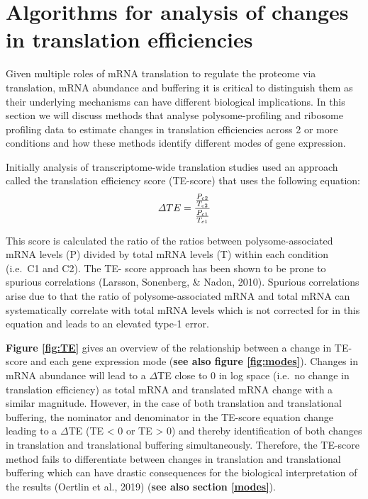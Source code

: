 \documentclass[12pt,openany]{book}
\begin{document}
\section{Algorithms for analysis of changes in translation efficiencies}\label{algorithm}

Given multiple roles of mRNA translation to regulate the proteome via
translation, mRNA abundance and buffering it is critical to distinguish
them as their underlying mechanisms can have different biological
implications. In this section we will discuss methods that analyse
polysome-profiling and ribosome profiling data to estimate changes in
translation efficiencies across 2 or more conditions and how these
methods identify different modes of gene expression.

Initially analysis of transcriptome-wide translation studies used an
approach called the translation efficiency score (TE-score) that uses
the following equation:
\[\varDelta TE = \frac{\frac{P_{c2}}{T_{c2}}} {\frac{P_{c1}}{T_{c1}}}\\\]

This score is calculated the ratio of the ratios between
polysome-associated mRNA levels (P) divided by total mRNA levels (T)
within each condition (i.e.~C1 and C2). The TE- score approach has been
shown to be prone to spurious correlations (Larsson, Sonenberg, \&
Nadon, 2010). Spurious correlations arise due to that the ratio of
polysome-associated mRNA and total mRNA can systematically correlate
with total mRNA levels which is not corrected for in this equation and
leads to an elevated type-1 error.

\textbf{Figure \ref{fig:TE}} gives an overview of the relationship
between a change in TE-score and each gene expression mode (\textbf{see
also figure \ref{fig:modes}}). Changes in mRNA abundance will lead to a
\(\varDelta\)TE close to 0 in log space (i.e.~no change in translation
efficiency) as total mRNA and translated mRNA change with a similar
magnitude. However, in the case of both translation and translational
buffering, the nominator and denominator in the TE-score equation change
leading to a \(\varDelta\)TE (TE \textless{} 0 or TE \textgreater{} 0)
and thereby identification of both changes in translation and
translational buffering simultaneously. Therefore, the TE-score method
fails to differentiate between changes in translation and translational
buffering which can have drastic consequences for the biological
interpretation of the results (Oertlin et al., 2019) (\textbf{see also
section \ref{modes}}).
\end{document}

